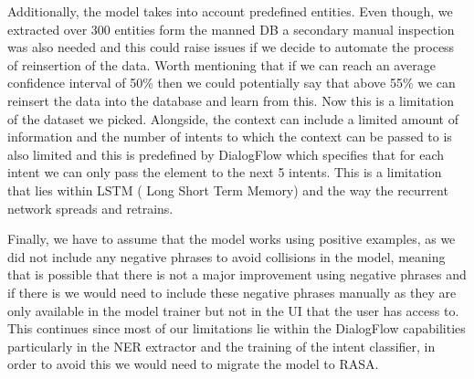 Additionally, the model takes into account predefined entities. Even though, we extracted over 300 entities form the manned DB a secondary manual inspection was also needed and this could raise issues if we decide to automate the process of reinsertion of the data. Worth mentioning that if we can reach an average confidence interval of 50\% then we could potentially say that above 55\% we can reinsert the data into the database and learn from this. Now this is a limitation of the dataset we picked. Alongside, the context can include a limited amount of information and the number of intents to which the context can be passed to is also limited and this is predefined by DialogFlow which specifies that for each intent we can only pass the element to the next 5 intents. This is a limitation that lies within LSTM ( Long Short Term Memory) and the way the recurrent network spreads and retrains.

Finally, we have to assume that the model works using positive examples, as we did not include any negative phrases to avoid collisions in the model, meaning that is possible that there is not a major improvement using negative phrases and if there is we would need to include these negative phrases manually as they are only available in the model trainer but not in the UI that the user has access to. This continues since most of our limitations lie within the DialogFlow capabilities particularly in the NER extractor and the training of the intent classifier, in order to avoid this we would need to migrate the model to RASA.


